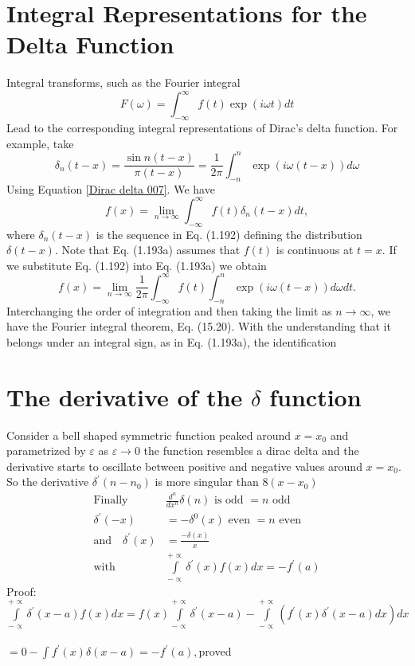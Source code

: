 \section{Integral Representations for the Delta Function}
Integral transforms, such as the Fourier integral
\begin{equation}
F(\omega)=\int_{-\infty}^{\infty} f(t) \exp (i \omega t) d t
\end{equation}
Lead to the corresponding integral representations of Dirac's delta function. For example, take
\begin{equation}
\delta_{n}(t-x)=\frac{\sin n(t-x)}{\pi(t-x)}=\frac{1}{2 \pi} \int_{-n}^{n} \exp (i \omega(t-x)) d \omega \label{Dirac delta 007}
\end{equation}
Using Equation \ref{Dirac delta 007}. We have
$$
f(x)=\lim _{n \rightarrow \infty} \int_{-\infty}^{\infty} f(t) \delta_{n}(t-x) d t,
$$
where $\delta_{n}(t-x)$ is the sequence in Eq. (1.192) defining the distribution $\delta(t-x)$. Note that Eq. (1.193a) assumes that $f(t)$ is continuous at $t=x$. If we substitute Eq. (1.192) into Eq. (1.193a) we obtain
$$
f(x)=\lim _{n \rightarrow \infty} \frac{1}{2 \pi} \int_{-\infty}^{\infty} f(t) \int_{-n}^{n} \exp (i \omega(t-x)) d \omega d t .
$$
Interchanging the order of integration and then taking the limit as $n \rightarrow \infty$, we have the Fourier integral theorem, Eq. (15.20).
With the understanding that it belongs under an integral sign, as in Eq. (1.193a), the identification
\section{The derivative of the $\delta$ function}
Consider a bell shaped symmetric function peaked around $x=x_0$ and parametrized by $\varepsilon$ as $\varepsilon\rightarrow0$ the function resembles a dirac delta and the derivative starts to oscillate between positive and negative values around $x=x_0$. So the derivative $\delta^\prime(n-n_0)$ is more singular than $8(x-x_0)$
\begin{align*}
\text{Finally }\quad&\frac{d^n}{dx^n}\delta(n)\text{ is odd $=n$ odd}\\
\delta^\prime(-x)&=-\delta^0(x)\text{ even $=n$ even}\\
\text{and}\quad \delta^\prime (x) &=\frac{-\delta(x)}{x}\\
\text{with} &\int\limits_{-\propto}^{+\propto}\delta^\prime (x)f(x)dx=-f^\prime(a)
\end{align*}
Proof: $\int\limits_{-\propto}^{+\propto}\delta^\prime (x-a)f(x)dx=f(x)\int\limits_{-\propto}^{+\propto}\delta^\prime (x-a)-\int\limits_{-\propto}^{+\propto}(f^\prime (x)\delta^\prime(x-a)dx)dx$\\\\
$=0-\int f^\prime(x)\delta(x-a)=-f^\prime(a),$proved
